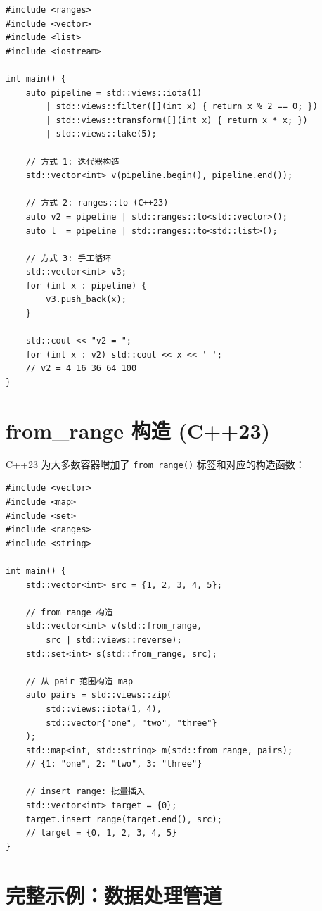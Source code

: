 \documentclass[12pt,a4paper,fontset=fandol]{ctexbook}
\newcommand{\cpp}[1]{C++#1}
\newcommand{\Fn}[1]{\texttt{#1()}}
\begin{document}
\begin{lstlisting}
#include <ranges>
#include <vector>
#include <list>
#include <iostream>

int main() {
    auto pipeline = std::views::iota(1)
        | std::views::filter([](int x) { return x % 2 == 0; })
        | std::views::transform([](int x) { return x * x; })
        | std::views::take(5);

    // 方式 1: 迭代器构造
    std::vector<int> v(pipeline.begin(), pipeline.end());

    // 方式 2: ranges::to (C++23)
    auto v2 = pipeline | std::ranges::to<std::vector>();
    auto l  = pipeline | std::ranges::to<std::list>();

    // 方式 3: 手工循环
    std::vector<int> v3;
    for (int x : pipeline) {
        v3.push_back(x);
    }

    std::cout << "v2 = ";
    for (int x : v2) std::cout << x << ' ';
    // v2 = 4 16 36 64 100
}
\end{lstlisting}

\section{from\_range 构造 (C++23)}

\cpp{23} 为大多数容器增加了 \Fn{from\_range} 标签和对应的构造函数：

\begin{lstlisting}
#include <vector>
#include <map>
#include <set>
#include <ranges>
#include <string>

int main() {
    std::vector<int> src = {1, 2, 3, 4, 5};

    // from_range 构造
    std::vector<int> v(std::from_range,
        src | std::views::reverse);
    std::set<int> s(std::from_range, src);

    // 从 pair 范围构造 map
    auto pairs = std::views::zip(
        std::views::iota(1, 4),
        std::vector{"one", "two", "three"}
    );
    std::map<int, std::string> m(std::from_range, pairs);
    // {1: "one", 2: "two", 3: "three"}

    // insert_range: 批量插入
    std::vector<int> target = {0};
    target.insert_range(target.end(), src);
    // target = {0, 1, 2, 3, 4, 5}
}
\end{lstlisting}

\section{完整示例：数据处理管道}
\end{document}
